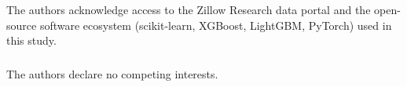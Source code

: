 \documentclass[runningheads]{llncs}
\begin{document}
\begin{credits}
\subsubsection{\ackname}
The authors acknowledge access to the Zillow Research data portal
and the open-source software ecosystem (scikit-learn, XGBoost,
LightGBM, PyTorch) used in this study.

\subsubsection{\discintname}
The authors declare no competing interests.
\end{credits}


\end{document}
